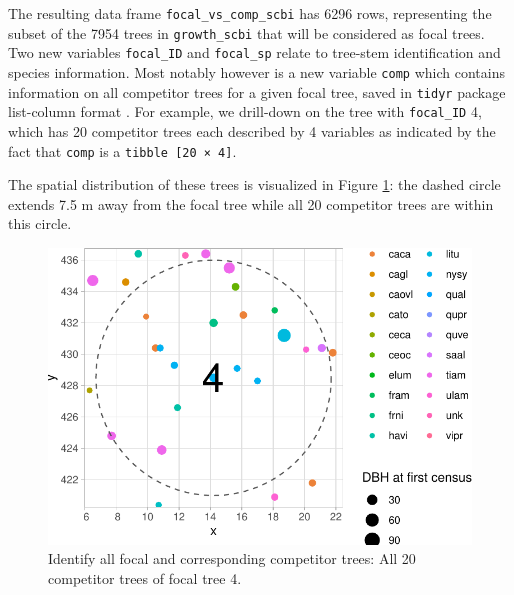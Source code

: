 \documentclass[12pt]{article}
\newenvironment{Shaded}{\begin{snugshade}}{\end{snugshade}}
\newcommand{\CommentTok}[1]{\textcolor[rgb]{0.56,0.35,0.01}{\textit{#1}}}
\newcommand{\DecValTok}[1]{\textcolor[rgb]{0.00,0.00,0.81}{#1}}
\newcommand{\KeywordTok}[1]{\textcolor[rgb]{0.13,0.29,0.53}{\textbf{#1}}}
\newcommand{\NormalTok}[1]{#1}
\newcommand{\OperatorTok}[1]{\textcolor[rgb]{0.81,0.36,0.00}{\textbf{#1}}}
\newcommand{\StringTok}[1]{\textcolor[rgb]{0.31,0.60,0.02}{#1}}
\begin{document}
The resulting data frame \texttt{focal\_vs\_comp\_scbi} has 6296 rows,
representing the subset of the 7954 trees in \texttt{growth\_scbi} that
will be considered as focal trees. Two new variables \texttt{focal\_ID}
and \texttt{focal\_sp} relate to tree-stem identification and species
information. Most notably however is a new variable \texttt{comp} which
contains information on all competitor trees for a given focal tree,
saved in \texttt{tidyr} package list-column format
\citep{tidyr_package}. For example, we drill-down on the tree with
\texttt{focal\_ID} 4, which has 20 competitor trees each described by 4
variables as indicated by the fact that \texttt{comp} is a
\texttt{tibble\ {[}20\ ×\ 4{]}}.

\begin{Shaded}
\end{Shaded}

The spatial distribution of these trees is visualized in Figure
\ref{fig:scbi-focal-vs-comp-map}: the dashed circle extends 7.5 m away
from the focal tree while all 20 competitor trees are within this
circle.

\begin{figure}

{\centering \includegraphics[width=0.66\linewidth]{Figures/scbi-focal-vs-comp-map-1} 

}

\caption{Identify all focal and corresponding competitor trees: All 20 competitor trees of focal tree 4.}\label{fig:scbi-focal-vs-comp-map}
\end{figure}
\end{document}
